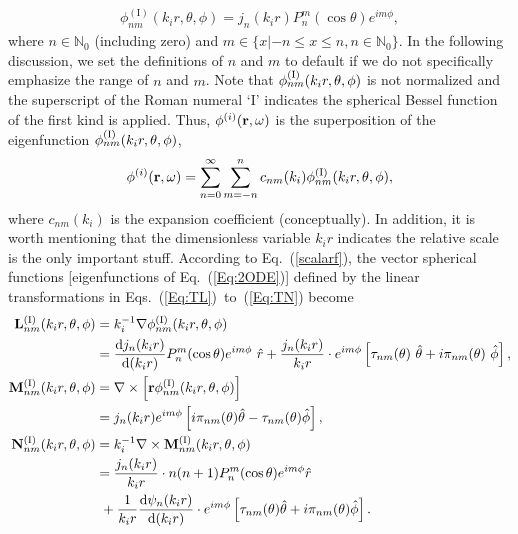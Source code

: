 \documentclass[journal=jacsat,manuscript=article,layout=traditional]{achemso}
\newcommand*\diff{\mathrm{d}}
\newcommand{\RomanI}{\scriptsize\textrm{I}}
\begin{document}
\begin{align}
    \phi_{nm}^{\mathrm{(I)}}(k_ir,\theta,\phi)=j_n(k_ir)P_n^m(\cos\theta)e^{im\phi},
    \label{scalarf}
\end{align}
where $n\in\mathbb{N}_0$ (including zero) and $m\in\{x|-n\leq x\leq n, n\in\mathbb{N}_0\}$.
In the following discussion, we set the definitions of $n$ and $m$ to default if we do not specifically emphasize the range of $n$ and $m$. 
Note that $\phi_{nm}^{(\RomanI)}(k_ir,\theta,\phi)$ is not normalized and the superscript of the Roman numeral `I' indicates the spherical Bessel function of the first kind is applied.
Thus, $\phi^{(i)}(\vb{r},\omega)$ is the superposition of the eigenfunction $\phi_{nm}^{(\RomanI)}(k_ir,\theta,\phi)$,
\begin{align}
    \phi^{(i)}(\vb{r},\omega)=\sum_{n=0}^\infty\sum_{m=-n}^nc_{nm}(k_i)\phi_{nm}^{(\RomanI)}(k_ir,\theta,\phi),
\end{align}
where $c_{nm}(k_i)$ is the expansion coefficient (conceptually).
In addition, it is worth mentioning that the dimensionless variable $k_ir$ indicates the relative scale is the only important stuff.
\noindent
According to Eq.~(\ref{scalarf}), the vector spherical functions [eigenfunctions of Eq.~(\ref{Eq:2ODE})] defined by the linear transformations in Eqs.~(\ref{Eq:TL})~to~(\ref{Eq:TN}) become
\begin{align}
    \nonumber
    \mathbf{L}_{nm}^{(\RomanI)} (k_ir,\theta,\phi) &= k_i^{-1}\nabla\phi_{nm}^{(\RomanI)}(k_ir,\theta,\phi)\\
    &= \frac{\diff j_n(k_ir)}{\diff(k_ir)} P_n^m(\cos{\theta})e^{im\phi}~\hat{r} + \frac{j_n(k_ir)}{k_ir}\cdot e^{im\phi}\left[ \tau_{nm}(\theta)~\hat{\theta}+i\pi_{nm}(\theta)~\hat{\phi} \right],
    \label{Eq:defL}\\
    \nonumber
    \mathbf{M}_{nm}^{(\RomanI)} (k_ir,\theta,\phi) &= \nabla\times\left[ \mathbf{r} \phi_{nm}^{(\RomanI)}(k_ir,\theta,\phi) \right]\\
    &= j_n(k_ir)e^{im\phi}\left[ i\pi_{nm}(\theta)\hat{\theta}-\tau_{nm}(\theta)\hat{\phi} \right],
    \label{Eq:defM}\\
    \nonumber
    \mathbf{N}_{nm}^{(\RomanI)} (k_ir,\theta,\phi) &= k_i^{-1}\nabla\times\mathbf{M}_{nm}^{(\RomanI)} (k_ir,\theta,\phi)\\
    \nonumber
    &= \frac{j_n(k_ir)}{k_ir} \cdot n(n+1)P_n^m(\cos{\theta})e^{im\phi}\hat{r}\\
    \label{Eq:defN}
    &~+ \frac{1}{k_ir}\frac{\diff \psi_n(k_ir)}{\diff(k_ir)}\cdot e^{im\phi}\left[ \tau_{nm}(\theta)\hat{\theta}+i\pi_{nm}(\theta)\hat{\phi} \right].
\end{align}
\end{document}

